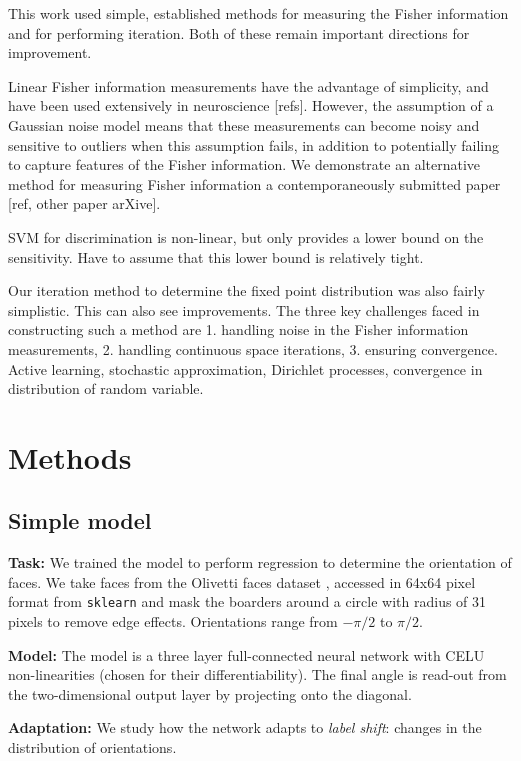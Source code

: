 \documentclass[10pt, twocolumn]{article}      %
\begin{document}
This work used simple, established methods for measuring the Fisher information and for performing iteration.
Both of these remain important directions for improvement.

Linear Fisher information measurements have the advantage of simplicity, and have been used extensively in neuroscience [refs].
However, the assumption of a Gaussian noise model means that these measurements can become noisy and sensitive to outliers when this assumption fails, in addition to potentially failing to capture features of the Fisher information.
We demonstrate an alternative method for measuring Fisher information a contemporaneously submitted paper [ref, other paper arXive].

SVM for discrimination is non-linear, but only provides a lower bound on the sensitivity. Have to assume that this lower bound is relatively tight.

Our iteration method to determine the fixed point distribution was also fairly simplistic.
This can also see improvements.
The three key challenges faced in constructing such a method are 1. handling noise in the Fisher information measurements, 2. handling continuous space iterations, 3. ensuring convergence. 
Active learning, stochastic approximation, Dirichlet processes, convergence in distribution of random variable.



\section{Methods}

\subsection{Simple model}
\textbf{Task:} We trained the model to perform regression to determine the orientation of faces.
We take faces from the Olivetti faces dataset \cite{samaria_parameterisation_1994,Olivetti}, accessed in 64x64 pixel format from \texttt{sklearn} and mask the boarders around a circle with radius of 31 pixels to remove edge effects.
Orientations range from $-\pi/2$ to $\pi/2$.

\noindent \textbf{Model:} The model is a three layer full-connected neural network with CELU non-linearities \cite{barron_continuously_2017} (chosen for their differentiability). The final angle is read-out from the two-dimensional output layer by projecting onto the diagonal. 

\noindent \textbf{Adaptation:} We study how the network adapts to \textit{label shift}: changes in the distribution of orientations.
\end{document}
